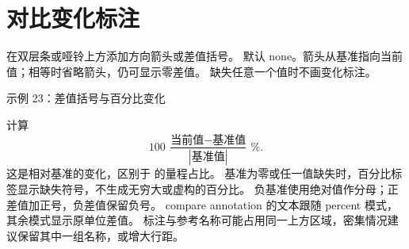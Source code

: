 \section{对比变化标注}
 在双层条或哑铃上方添加方向箭头或差值括号。
默认 none。箭头从基准指向当前值；相等时省略箭头，仍可显示零差值。
缺失任意一个值时不画变化标注。

\begin{example}[text and listing,sidebyside=false]{示例 23：差值括号与百分比变化}


\end{example}
 计算
\[
  100\,\frac{\text{当前值}-\text{基准值}}{|\text{基准值}|}\,\% .
\]
这是相对基准的变化，区别于  的量程占比。
基准为零或任一值缺失时，百分比标签显示缺失符号，不生成无穷大或虚构的百分比。
负基准使用绝对值作分母；正差值加正号，负差值保留负号。
compare annotation 的文本跟随 percent 模式，其余模式显示原单位差值。
标注与参考名称可能占用同一上方区域，密集情况建议保留其中一组名称，或增大行距。
